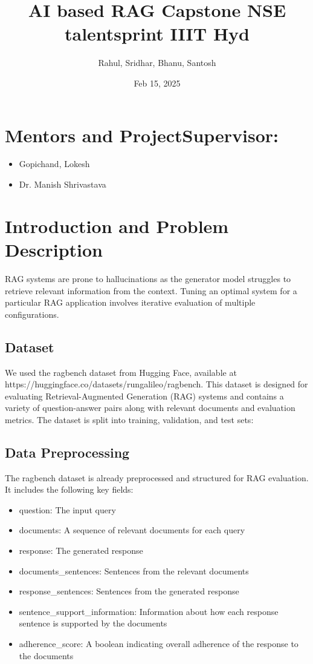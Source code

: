 \documentclass{article}
\title{AI based RAG Capstone NSE talentsprint IIIT Hyd}
\author{Rahul, Sridhar, Bhanu, Santosh}
\date{Feb 15, 2025}
\begin{document}
\maketitle

\section*{Mentors and ProjectSupervisor:}
\begin{itemize}
    \item Gopichand, Lokesh
    \item Dr. Manish Shrivastava
\end{itemize}

\tableofcontents

\section{Introduction and Problem Description}

RAG systems are prone to hallucinations as the generator model struggles to retrieve relevant information from the context. Tuning an optimal system for a particular RAG application involves iterative evaluation of multiple configurations.  

\subsection{Dataset}
We used the ragbench dataset from Hugging Face, available at https://huggingface.co/datasets/rungalileo/ragbench. This dataset is designed for evaluating Retrieval-Augmented Generation (RAG) systems and contains a variety of question-answer pairs along with relevant documents and evaluation metrics.
The dataset is split into training, validation, and test sets:



\subsection{Data Preprocessing}
The ragbench dataset is already preprocessed and structured for RAG evaluation. It includes the following key fields:

\begin{itemize}
    \item question: The input query
    \item documents: A sequence of relevant documents for each query
    \item response: The generated response
    \item documents\_sentences: Sentences from the relevant documents
    \item response\_sentences: Sentences from the generated response
    \item sentence\_support\_information: Information about how each response sentence is supported by the documents
    \item adherence\_score: A boolean indicating overall adherence of the response to the documents
\end{itemize}
 
\end{document}
